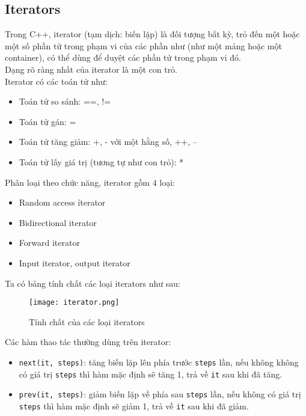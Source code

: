 \subsection{Iterators}
Trong C++, iterator (tạm dịch: biến lặp) là đối tượng bất kỳ, trỏ đến một hoặc một số phần tử trong phạm vi của các phần như (như một mảng hoặc một container), có thể dùng để duyệt các phần tử trong phạm vi đó. \cite{vnoi}\\
Dạng rõ ràng nhất của iterator là một con trỏ.\\
Iterator có các toán tử như: \cite{vnoi}
\begin{itemize}
    \item Toán tử so sánh: ==, !=
    \item Toán tử gán: =
    \item Toán tử tăng giảm: +, - với một hằng số, ++, --
    \item Toán tử lấy giá trị (tương tự như con trỏ): *
\end{itemize}
Phân loại theo chức năng, iterator gồm $4$ loại: \cite{iterator}
\begin{itemize}
    \item Random access ỉterator
    \item Bidirectional iterator
    \item Forward iterator
    \item Input iterator, output iterator
\end{itemize}
Ta có bảng tính chất các loại iterators như sau:\cite{iterator}
\begin{figure}[H]
\centering
\texttt{[image: iterator.png]}
\caption{Tính chất của các loại iterators}
\end{figure}
Các hàm thao tác thường dùng trên iterator:
\begin{itemize}
    \item \lstinline{next(it, steps)}: tăng biến lặp lên phía trước \lstinline{steps} lần, nếu không không có giá trị \lstinline{steps} thì hàm mặc định sẽ tăng 1, trả về \lstinline{it} sau khi đã tăng.
    \item \lstinline{prev(it, steps)}: giảm biến lặp về phía sau \lstinline{steps} lần, nếu không có giá trị \lstinline{steps} thì hàm mặc định sẽ giảm 1, trả về \lstinline{it} sau khi đã giảm.
\end{itemize}

